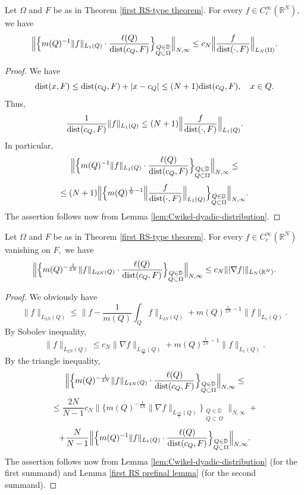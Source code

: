 \documentclass{amsart}
\begin{document}
\begin{lemma}\label{first RS prefinal lemma} Let $\Omega$ and $F$ be as in Theorem \ref{first RS-type theorem}. For every $f\in C^{\infty}_c(\mathbb{R}^N),$  we have
$$\Big\|\Big\{m(Q)^{-1}\|f\|_{L_1(Q)}\cdot\frac{\ell(Q)}{{\rm dist}(c_Q,F)}\Big\}_{\substack{Q\in\mathbb{D}\\ Q\subset\Omega}}
\Big\|_{N,\infty}\leq c_N\Big\|\frac{f}{{\rm dist}(\cdot,F)}\Big\|_{L_N(\Omega)}.$$
\end{lemma}
\begin{proof} We have
$${\rm dist}(x,F)\leq{\rm dist}(c_Q,F)+|x-c_Q|\leq (N+1){\rm dist}(c_Q,F),\quad x\in Q.$$
Thus,
$$\frac1{{\rm dist}(c_Q,F)}\|f\|_{L_1(Q)}\leq (N+1)\Big\|\frac{f}{{\rm dist}(\cdot,F)}\Big\|_{L_1(Q)}.$$
In particular,
$$\Big\|\Big\{m(Q)^{-1}\|f\|_{L_1(Q)}\cdot\frac{\ell(Q)}{{\rm dist}(c_Q,F)}\Big\}_{\substack{Q\in\mathbb{D}\\ Q\subset\Omega}}
\Big\|_{N,\infty}\leq $$
$$\leq (N+1)\Big\|\Big\{m(Q)^{\frac1N-1}\Big\|\frac{f}{{\rm dist}(\cdot,F)}\Big\|_{L_1(Q)}\Big\}_{\substack{Q\in\mathbb{D}\\ Q\subset\Omega}}
\Big\|_{N,\infty}.$$
The assertion follows now from Lemma \ref{lem:Cwikel-dyadic-distribution}.
\end{proof}

\begin{lemma}\label{first RS final lemma} Let $\Omega$ and $F$ be as in Theorem \ref{first RS-type theorem}. For every $f\in C^{\infty}_c(\mathbb{R}^N)$ vanishing on $F,$ we have
$$\Big\|\Big\{m(Q)^{-\frac1{2N}}\|f\|_{L_{2N}(Q)}\cdot\frac{\ell(Q)}{{\rm dist}(c_Q,F)}\Big\}_{\substack{Q\in\mathbb{D}\\ Q\subset\Omega}}
\Big\|_{N,\infty}\leq c_N\||\nabla f|\|_{L_N(\mathbb{R}^N)}.$$
\end{lemma}
\begin{proof} We obviously have
$$\|f\|_{L_{2N}(Q)}\leq\Big\|f-\frac1{m(Q)}\int_Qf\Big\|_{L_{2N}(Q)}+m(Q)^{\frac1{2N}-1}\|f\|_{L_1(Q)}.$$
By Sobolev inequality,
$$\|f\|_{L_{2N}(Q)}\leq c_N\|\nabla f\|_{L_{\frac{2N}{3}}(Q)}+m(Q)^{\frac1{2N}-1}\|f\|_{L_1(Q)}.$$
By the triangle inequality,
$$\Big\|\Big\{m(Q)^{-\frac1{2N}}\|f\|_{L_{2N}(Q)}\cdot\frac{\ell(Q)}{{\rm dist}(c_Q,F)}\Big\}_{\substack{Q\in\mathbb{D}\\ Q\subset\Omega}}
\Big\|_{N,\infty}\leq$$
$$\leq\frac{2N}{N-1}c_N\Big\|\Big\{m(Q)^{-\frac1{2N}}\|\nabla f\|_{L_{\frac{2N}{3}}(Q)}\Big\}_{\substack{Q\in\mathbb{D}\\ Q\subset\Omega}}\Big\|_{N,\infty}+$$
$$+\frac{N}{N-1}\Big\|\Big\{m(Q)^{-1}\|f\|_{L_1(Q)}\cdot\frac{\ell(Q)}{{\rm dist}(c_Q,F)}\Big\}_{\substack{Q\in\mathbb{D}\\ Q\subset\Omega}}
\Big\|_{N,\infty}.$$
The assertion follows now from Lemma \ref{lem:Cwikel-dyadic-distribution} (for the first summand) and Lemma \ref{first RS prefinal lemma} (for the second summand).
\end{proof}
\end{document}
